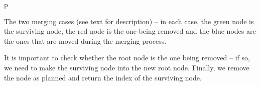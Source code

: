 \begin{stusubfig}{p}
	\hspace{4mm}%
\caption{The two merging cases (see text for description) -- in each case, the green node is the surviving node, the red node is the one being removed and the blue nodes are the ones that are moved during the merging process.}
\label{fig:appendixds-mst-mergecases}
\end{stusubfig}

It is important to check whether the root node is the one being removed -- if so, we need to make the surviving node into the new root node. Finally, we remove the node as planned and return the index of the surviving node.
